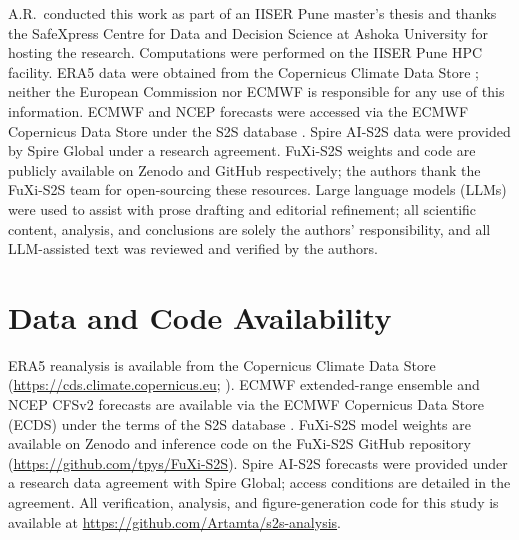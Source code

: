 \documentclass[11pt]{article}
\begin{document}
A.R.\ conducted this work as part of an IISER Pune master's thesis and
thanks the SafeXpress Centre for Data and Decision Science at Ashoka
University for hosting the research. Computations were performed on the
IISER Pune HPC facility. ERA5 data were obtained from the Copernicus
Climate Data Store \citep{hersbach2020}; neither the European Commission
nor ECMWF is responsible for any use of this information. ECMWF and NCEP
forecasts were accessed via the ECMWF Copernicus Data Store under the
S2S database \citep{vitart2017}. Spire AI-S2S data were provided by
Spire Global under a research agreement. FuXi-S2S weights and code are
publicly available on Zenodo and GitHub respectively; the authors thank
the FuXi-S2S team for open-sourcing these resources. Large language models (LLMs) were used to assist with prose drafting
and editorial refinement; all scientific content, analysis, and
conclusions are solely the authors' responsibility, and all
LLM-assisted text was reviewed and verified by the authors.

\section*{Data and Code Availability}

ERA5 reanalysis is available from the Copernicus Climate Data Store
(\url{https://cds.climate.copernicus.eu}; \citealt{hersbach2020}).
ECMWF extended-range ensemble and NCEP CFSv2 forecasts are available
via the ECMWF Copernicus Data Store (ECDS) under the terms of the S2S
database \citep{vitart2017}. FuXi-S2S model weights are available on
Zenodo and inference code on the FuXi-S2S GitHub repository
(\url{https://github.com/tpys/FuXi-S2S}). Spire AI-S2S forecasts were
provided under a research data agreement with Spire Global; access
conditions are detailed in the agreement. All verification, analysis, and figure-generation code for this study
is available at \url{https://github.com/Artamta/s2s-analysis}.
\end{document}
